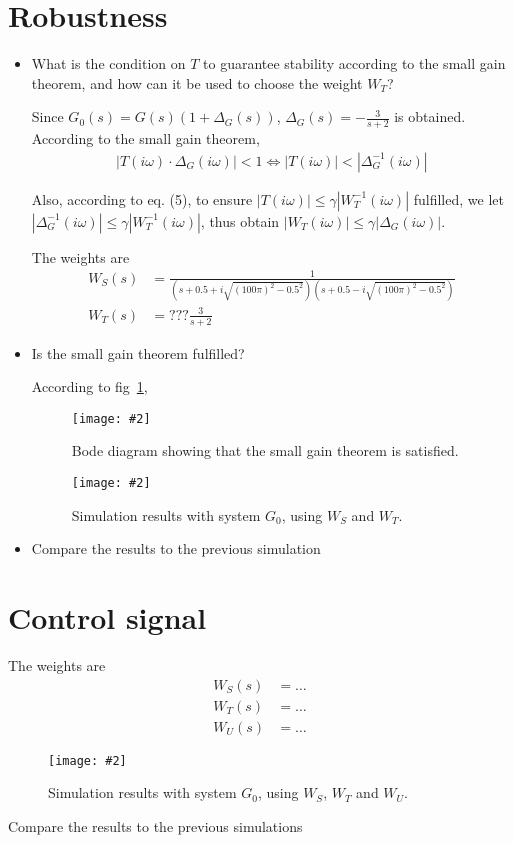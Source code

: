 \documentclass[11pt,a4paper]{article}
\newcommand{\image}[3]{
	\begin{figure}[!ht]
		\centering
	    \texttt{[image: \#2]}
		\caption{#3}
		\label{fig:#2}
	\end{figure}
}
\begin{document}
\section*{Robustness}
	\begin{itemize}
		\item What is the condition on $T$ to guarantee stability according to the small gain theorem, and how can it be used to choose the weight $W_T$?
		\par Since $G_{0}(s) = G(s)(1 + \Delta_{G}(s))$, $\Delta_{G}(s) = -\frac{3}{s+2}$ is obtained. According to the small gain theorem,
			\begin{align*}
				|T(i\omega)\cdot\Delta_{G}(i\omega)| < 1 \Leftrightarrow |T(i\omega)| < |\Delta^{-1}_{G}(i\omega)|
			\end{align*}
		\par Also, according to eq. (5), to ensure $|T(i\omega)| \leq \gamma |W^{-1}_{T}(i\omega)|$ fulfilled, we let $|\Delta^{-1}_{G}(i\omega)| \leq \gamma |W^{-1}_{T}(i\omega)|$, thus obtain $ |W_{T}(i\omega)| \leq \gamma |\Delta_{G}(i\omega)| $.
		\par The weights are
			\begin{align*}
				W_S(s) &= \frac{1}{(s+0.5+i\sqrt{(100\pi)^{2}-0.5^{2}})(s+0.5-i\sqrt{(100\pi)^{2}-0.5^{2}})} \\
				W_T(s) &= ???\frac{3}{s + 2}
			\end{align*}
			
		\item Is the small gain theorem fulfilled?
		\par According to fig~\ref{fig:423},
			\image{0.85}{423}{Bode diagram showing that the small gain theorem is satisfied.}
			\image{0.85}{422}{Simulation results with system $G_0$, using $W_S$ and $W_T$.}
		
		\item Compare the results to the previous simulation
	\end{itemize}


\section*{Control signal}
\par The weights are
	\begin{align*}
		W_S(s) &= \ldots\\
		W_T(s) &= \ldots\\
		W_U(s) &= \ldots
	\end{align*}

	\image{0.85}{431}{Simulation results with system $G_0$, using $W_S$, $W_T$ and $W_U$.}

\par Compare the results to the previous simulations
\par\dotfill\par\dotfill\par
\end{document}
